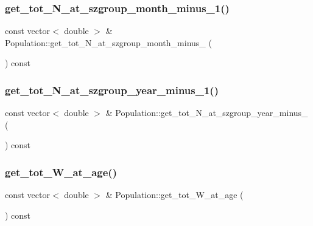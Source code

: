 \mbox{\label{class_population_a0cacac923ccbd019c7d397a0c6e1bff4}} 
\subsubsection{\texorpdfstring{get\_tot\_N\_at\_szgroup\_month\_minus\_1()}{get\_tot\_N\_at\_szgroup\_month\_minus\_1()}}
{\footnotesize\ttfamily const vector$<$ double $>$ \& Population\+::get\+\_\+tot\+\_\+\+N\+\_\+at\+\_\+szgroup\+\_\+month\+\_\+minus\+\_ (\begin{DoxyParamCaption}{ }\end{DoxyParamCaption}) const}

\mbox{\label{class_population_aa96c7a424f8288c20b65ac193f7ae498}} 
\subsubsection{\texorpdfstring{get\_tot\_N\_at\_szgroup\_year\_minus\_1()}{get\_tot\_N\_at\_szgroup\_year\_minus\_1()}}
{\footnotesize\ttfamily const vector$<$ double $>$ \& Population\+::get\+\_\+tot\+\_\+\+N\+\_\+at\+\_\+szgroup\+\_\+year\+\_\+minus\+\_ (\begin{DoxyParamCaption}{ }\end{DoxyParamCaption}) const}

\mbox{\label{class_population_af7478d805116695ff97d0f5807a0fac3}} 
\subsubsection{\texorpdfstring{get\_tot\_W\_at\_age()}{get\_tot\_W\_at\_age()}}
{\footnotesize\ttfamily const vector$<$ double $>$ \& Population\+::get\+\_\+tot\+\_\+\+W\+\_\+at\+\_\+age (\begin{DoxyParamCaption}{ }\end{DoxyParamCaption}) const}

